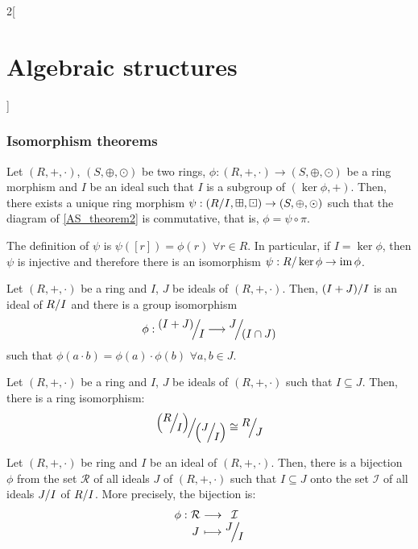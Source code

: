 \documentclass[../../../main_math.tex]{subfiles}
\begin{document}
\begin{multicols}{2}[\section{Algebraic structures}]
  \subsubsection{Isomorphism theorems}
  \begin{theorem}
    Let $(R,+,\cdot)$, $(S,\oplus,\odot)$ be two rings, $\phi:(R,+,\cdot)\rightarrow (S,\oplus,\odot)$ be a ring morphism and $I$ be an ideal such that $I$ is a subgroup of $(\ker\phi,+)$. Then, there exists a unique ring morphism $\psi:\left(\quot{R}{I},\boxplus,\boxdot\right)\rightarrow (S,\oplus,\odot)$ such that the diagram of \cref{AS_theorem2} is commutative, that is, $\phi=\psi\circ\pi$.
    \begin{center}
      \begin{minipage}{\linewidth}
        \centering
        
        \label{AS_theorem2}
      \end{minipage}
    \end{center}
    The definition of $\psi$ is $\psi([r])=\phi(r)$ $\forall r\in R$.
    In particular, if $I=\ker\phi$, then $\psi$ is injective and therefore there is an isomorphism $\psi:R/\ker\phi\rightarrow\operatorname{im}\phi$.
  \end{theorem}
  \begin{theorem}
    Let $(R,+,\cdot)$ be a ring and $I$, $J$ be ideals of $(R,+,\cdot)$. Then, $\quot{(I+J)}{I}$ is an ideal of $\quot{R}{I}$ and there is a group isomorphism
    $$\phi:\quot{(I+J)}{I}\longrightarrow\quot{J}{(I\cap J)}$$ such that $\phi(a\cdot b)=\phi(a)\cdot\phi(b)$ $\forall a,b\in J$.
  \end{theorem}
  \begin{theorem}
    Let $(R,+,\cdot)$ be a ring and $I$, $J$ be ideals of $(R,+,\cdot)$ such that $I\subseteq J$. Then, there is a ring isomorphism:
    $$\quot{\left(\quot{R}{I}\right)}{\left(\quot{J}{I}\right)}\cong\quot{R}{J}$$
  \end{theorem}
  \begin{theorem}
    Let $(R,+,\cdot)$ be ring and $I$ be an ideal of $(R,+,\cdot)$. Then, there is a bijection $\phi$ from the set $\mathcal{R}$ of all ideals $J$ of $(R,+,\cdot)$ such that $I\subseteq J$ onto the set $\mathcal{I}$ of all ideals $\quot{J}{I}$ of $\quot{R}{I}$. More precisely, the bijection is:
    $$\function{\phi}{\mathcal{R}}{\mathcal{I}}{J}{\displaystyle\quot{J}{I}}$$
  \end{theorem}

\end{multicols}
\end{document}
